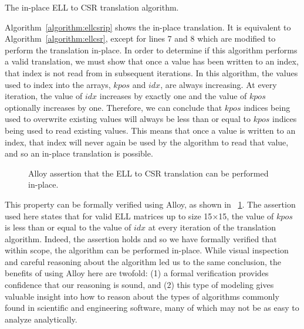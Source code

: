 \LinesNumbered
\begin{algorithm}

\caption{The in-place ELL to CSR translation algorithm.}
\label{algorithm:ellcsrip}
\end{algorithm}
\LinesNotNumbered

Algorithm~\ref{algorithm:ellcsrip} shows the in-place translation.  It is equivalent to Algorithm~\ref{algorithm:ellcsr}, except for lines 7 and 8 which are modified to perform the translation in-place.
In order to determine if this algorithm performs a valid translation, 
we must show that once a value has been written to an index, that index is not read from in subsequent iterations.  In this algorithm, the values used to index into the arrays, $kpos$ and $idx$, are always increasing.  At every iteration, the value of $idx$ increases by exactly one and the value of $kpos$ optionally increases by one.  Therefore, we can conclude that $kpos$ indices being used to overwrite existing values will always be less than or equal to $kpos$ indices being used to read existing values.
This means that once a value is written to an index, that index will never again be used by the algorithm to read that value, and so an in-place translation is possible.

\begin{figure}

\caption{Alloy assertion that the ELL to CSR translation can be performed in-place.}
\label{alloy:csrellip}
\end{figure}

This property can be formally verified using Alloy, as shown in \figurename~\ref{alloy:csrellip}.  The assertion used here states that for valid ELL matrices up to size 15$\times$15, the value of $kpos$ is less than or equal to the value of $idx$ at every iteration of the translation algorithm.  Indeed, the assertion holds and so we have formally verified that within scope, the algorithm can be performed in-place.  While visual inspection and careful reasoning about the algorithm led us to the same conclusion, the benefits of using Alloy here are twofold: (1) a formal verification provides confidence that our reasoning is sound, and (2) this type of modeling gives valuable insight into how to reason about the types of algorithms commonly found in scientific and engineering software, many of which may not be as easy to analyze analytically.